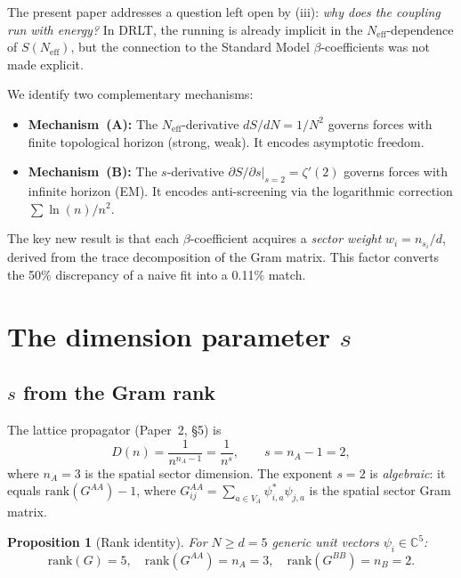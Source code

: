 \documentclass[12pt]{article}
\newtheorem{proposition}[theorem]{Proposition}
\theoremstyle{definition}
\theoremstyle{remark}
\newcommand{\CC}{\mathbb{C}}
\newcommand{\Neff}{N_{\mathrm{eff}}}
\begin{document}
The present paper addresses a question left open by (iii):
\emph{why does the coupling run with energy?}
In DRLT, the running is already implicit in the $\Neff$-dependence
of $S(\Neff)$, but the connection to the Standard Model
$\beta$-coefficients was not made explicit.

We identify two complementary mechanisms:
\begin{itemize}
\item \textbf{Mechanism~(A):} The $\Neff$-derivative
  $dS/dN = 1/N^2$ governs forces with finite topological
  horizon (strong, weak).
  It encodes asymptotic freedom.
\item \textbf{Mechanism~(B):} The $s$-derivative
  $\partial S / \partial s |_{s=2} = \zeta'(2)$
  governs forces with infinite horizon (EM).
  It encodes anti-screening via the logarithmic correction
  $\sum \ln(n)/n^2$.
\end{itemize}

The key new result is that each $\beta$-coefficient acquires
a \emph{sector weight} $w_i = n_{s_i}/d$, derived from
the trace decomposition of the Gram matrix.
This factor converts the 50\% discrepancy of a naive fit
into a 0.11\% match.

\section{The dimension parameter $s$}
\label{sec:dimension}

\subsection{$s$ from the Gram rank}

The lattice propagator (Paper~2, \S5) is
\begin{equation}
  D(n) = \frac{1}{n^{n_A - 1}} = \frac{1}{n^s},
  \qquad s = n_A - 1 = 2,
  \label{eq:propagator}
\end{equation}
where $n_A = 3$ is the spatial sector dimension.
The exponent $s = 2$ is \emph{algebraic}: it equals
$\mathrm{rank}(G^{AA}) - 1$, where $G^{AA}_{ij} = \sum_{a \in V_A}
\psi^*_{i,a}\psi_{j,a}$ is the spatial sector Gram matrix.

\begin{proposition}[Rank identity]
\label{prop:rank}
For $N \geq d = 5$ generic unit vectors $\psi_i \in \CC^5$:
\begin{equation}
  \mathrm{rank}(G) = 5, \quad
  \mathrm{rank}(G^{AA}) = n_A = 3, \quad
  \mathrm{rank}(G^{BB}) = n_B = 2.
\end{equation}
\end{proposition}
\end{document}
